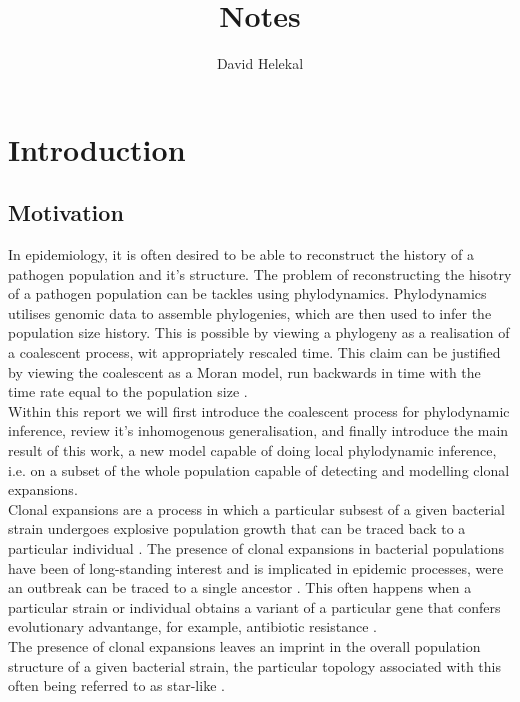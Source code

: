\documentclass{report}
\title{Notes}
\author{David Helekal}
\theoremstyle{definition}
\begin{document}
\maketitle
\newpage
\tableofcontents
\newpage
\chapter{Introduction}
\section{Motivation}
In epidemiology, it is often desired to be able to reconstruct the history of a pathogen population and it's structure. The problem of reconstructing the hisotry of a pathogen population can be tackles using phylodynamics. Phylodynamics utilises genomic data to assemble phylogenies, which are then used to infer the population size history. This is possible by viewing a phylogeny as a realisation of a coalescent process, wit appropriately rescaled time. This claim can be justified by viewing the coalescent as a Moran model, run backwards in time with the time rate equal to the population size \cite{griffiths_sampling_1994}.\\
Within this report we will first introduce the coalescent process for phylodynamic inference, review it's inhomogenous generalisation, and finally introduce the main result of this work, a new model capable of doing local phylodynamic inference, i.e. on a subset of the whole population capable of detecting and modelling clonal expansions.\\
Clonal expansions are a process in which a particular subsest of a given bacterial strain undergoes explosive population growth that can be traced back to a particular individual \cite{smith_how_1993}. The presence of clonal expansions in bacterial populations have been of long-standing interest and is implicated in epidemic processes, were an outbreak can be traced to a single ancestor \cite{smith_how_1993,spratt_displaying_2004,fraser_neutral_2005,ledda_re-emergence_2017}. This often happens when a particular strain or individual obtains a variant of a particular gene that confers evolutionary advantange, for example, antibiotic resistance \cite{holden_genomic_2013,hsu_evolutionary_2015, ledda_re-emergence_2017}.\\
The presence of clonal expansions leaves an imprint in the overall population structure of a given bacterial strain, the particular topology associated with this often being referred to as star-like \cite{smith_how_1993,spratt_displaying_2004}.
\end{document}
